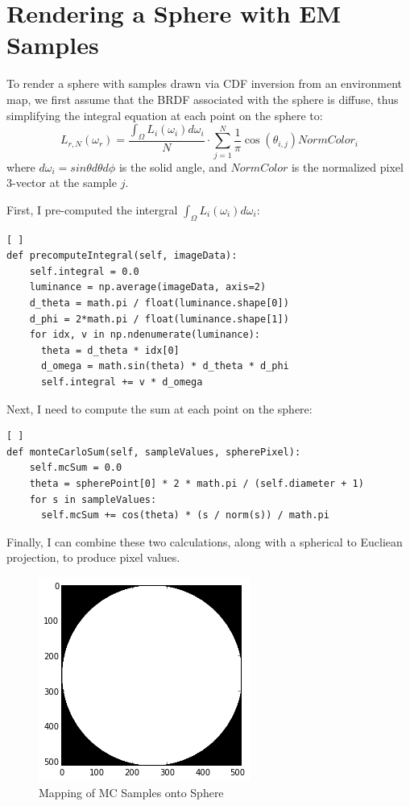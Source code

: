 \documentclass[a4paper,12pt,oneside,final]{report}
\newenvironment{changemargin}[2]{\begin{list}{}{%
\setlength{\topsep}{0pt}%
\setlength{\leftmargin}{0pt}%
\setlength{\rightmargin}{0pt}%
\setlength{\listparindent}{\parindent}%
\setlength{\itemindent}{\parindent}%
\setlength{\parsep}{0pt plus 1pt}%
\addtolength{\leftmargin}{#1}%
\addtolength{\rightmargin}{#2}%
}\item }{\end{list}}
\begin{document}
\chapter{Rendering a Sphere with EM Samples}
To render a sphere with samples drawn via CDF inversion from an environment map, we first assume that the BRDF associated with the sphere is diffuse, thus simplifying the integral equation at each point on the sphere to:
$$
L_{r, N} (\omega_r) = \frac{\int_{\Omega} L_i (\omega_i) d\omega_i}{N}\cdot \sum_{j=1}^N \frac{1}{\pi} \cos(\theta_{i,j}) NormColor_i
$$
where $d\omega_i = sin\theta d\theta d\phi$ is the solid angle, and $NormColor$ is the normalized pixel 3-vector at the sample $j$.

First, I pre-computed the intergral $\int_{\Omega} L_i (\omega_i) d\omega_i$:
\begin{lstlisting}[ ]
def precomputeIntegral(self, imageData):
    self.integral = 0.0
    luminance = np.average(imageData, axis=2)
    d_theta = math.pi / float(luminance.shape[0])
    d_phi = 2*math.pi / float(luminance.shape[1])
    for idx, v in np.ndenumerate(luminance):
      theta = d_theta * idx[0]
      d_omega = math.sin(theta) * d_theta * d_phi
      self.integral += v * d_omega
\end{lstlisting}
Next, I need to compute the sum at each point on the sphere:
\begin{lstlisting}[ ]
def monteCarloSum(self, sampleValues, spherePixel):
    self.mcSum = 0.0
    theta = spherePoint[0] * 2 * math.pi / (self.diameter + 1)
    for s in sampleValues:
      self.mcSum += cos(theta) * (s / norm(s)) / math.pi
\end{lstlisting}
Finally, I can combine these two calculations, along with a spherical to Eucliean projection, to produce pixel values.
\begin{figure}[!h]
  \begin{changemargin}{-50mm}{-50mm}
    \center
    \includegraphics[scale=1]{sampled_sphere.png}
    \caption{Mapping of MC Samples onto Sphere \label{fig:sampled_sphere}}
  \end{changemargin}
\end{figure}
\end{document}
